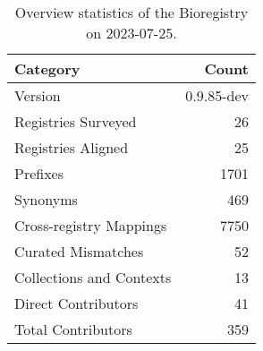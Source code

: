 \begin{table}
\caption{Overview statistics of the Bioregistry on 2023-07-25.}
\label{tab:bioregistry-summary}
\begin{tabular}{lr}
\toprule
Category & Count \\
\midrule
Version & 0.9.85-dev \\
Registries Surveyed & 26 \\
Registries Aligned & 25 \\
Prefixes & 1701 \\
Synonyms & 469 \\
Cross-registry Mappings & 7750 \\
Curated Mismatches & 52 \\
Collections and Contexts & 13 \\
Direct Contributors & 41 \\
Total Contributors & 359 \\
\bottomrule
\end{tabular}
\end{table}
